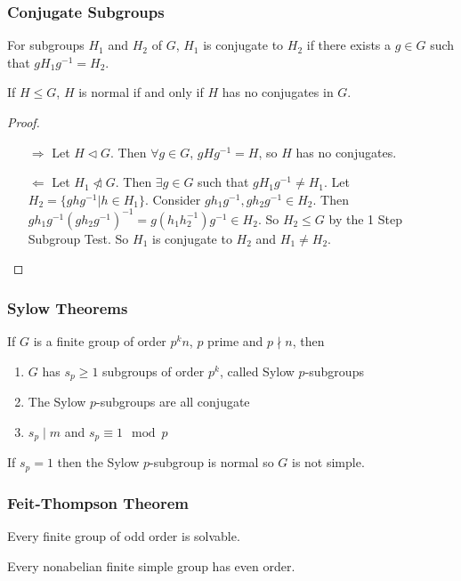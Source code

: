 \documentclass{beamer}
\begin{document}
\begin{frame}
	\frametitle{Conjugate Subgroups}
	\begin{definition}
	For subgroups $H_1$ and $H_2$ of $G$, $H_1$ is conjugate to $H_2$ if there exists a $g \in G$ such that $g H_1 g^{-1} = H_2$.
	\end{definition}
		\begin{theorem}
	If $H \le G$, $H$ is normal if and only if $H$ has no conjugates in $G$.
	\end{theorem}
	\begin{proof}
		\begin{enumerate}
			\item[$\Rightarrow$]
			Let $H \triangleleft G$. Then $\forall g \in G$, $g H g^{-1} = H$, so $H$ has no conjugates.
			\item[$\Leftarrow$]
			Let $H_1 \ntriangleleft G$. Then $\exists g \in G$ such that $g H_1 g^{-1} \ne H_1$. Let $H_2 = \{g h g^{-1} | h \in H_1\}$. Consider $g h_1 g^{-1}, g h_2 g^{-1} \in H_2$. Then $g h_1 g^{-1} (g h_2 g^{-1})^{-1} = g (h_1 h_2^{-1}) g^{-1} \in H_2$. So $H_2 \le G$ by the 1 Step Subgroup Test. So $H_1$ is conjugate to $H_2$ and $H_1 \ne H_2$.
		\end{enumerate}
	\end{proof}
\end{frame}

\begin{frame}
	\frametitle{Sylow Theorems}
	\begin{theorem}
	If $G$ is a finite group of order $p^k n$, $p$ prime and $p \nmid n$, then
	\begin{enumerate}
		\item $G$ has $s_p \ge 1$ subgroups of order $p^k$, called Sylow $p$-subgroups
		\item The Sylow $p$-subgroups are all conjugate
		\item $s_p \mid m$ and $s_p \equiv 1 \mod p$	
	\end{enumerate}
	\end{theorem}
	\begin{example}
	If $s_p = 1$ then the Sylow $p$-subgroup is normal so $G$ is not simple.
	\end{example}
\end{frame}

\begin{frame}
	\frametitle{Feit-Thompson Theorem}
	\begin{theorem}
	Every finite group of odd order is solvable.
	\end{theorem}
	\begin{corollary}
	Every nonabelian finite simple group has even order.
	\end{corollary}
\end{frame}
\end{document}
